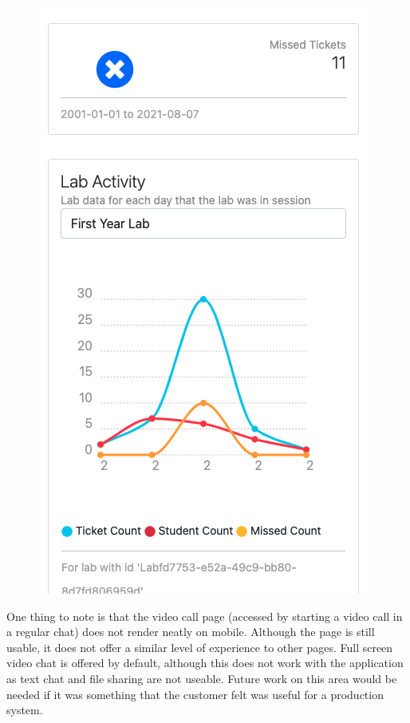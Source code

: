 \begin{figure}[H]
\begin{minipage}{.5\textwidth}
  \includegraphics[width=\linewidth]{8implementation/images/mobDemActiv.png}
  \label{fig:mobDemActiv}
\end{minipage}
\end{figure}

One thing to note is that the video call page (accessed by starting a video call in a regular chat) does not render neatly on mobile. Although the page is still usable, it does not offer a similar level of experience to other pages. Full screen video chat is offered by default, although this does not work with the application as text chat and file sharing are not useable. Future work on this area would be needed if it was something that the customer felt was useful for a production system.


